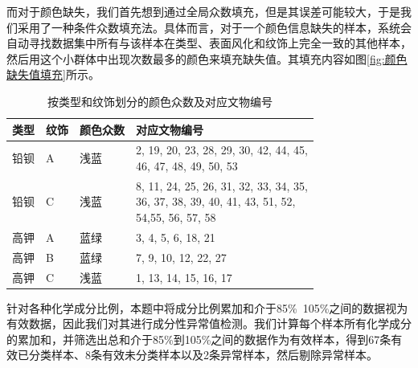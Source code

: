 而对于颜色缺失，我们首先想到通过全局众数填充，但是其误差可能较大，于是我们采用了一种条件众数填充法。具体而言，对于一个颜色信息缺失的样本，系统会自动寻找数据集中所有与该样本在类型、表面风化和纹饰上完全一致的其他样本，然后用这个小群体中出现次数最多的颜色来填充缺失值。其填充内容如图\ref{fig:颜色缺失值填充}所示。

\begin{table}[htbp]
	\centering
	\caption{按类型和纹饰划分的颜色众数及对应文物编号}
	\label{tab:颜色缺失值填充}
	\begin{tabular}{llll}
		\toprule
		\textbf{类型} & \textbf{纹饰} & \textbf{颜色众数} & \textbf{对应文物编号}                                        \\
		\midrule
		\rowcolor{gray!20}
		铅钡          & A           & 浅蓝            & \parbox[t]{6cm}{2, 19, 20, 23, 28, 29, 30, 42, 44, 45, \\ 46, 47, 48, 49, 50, 53} \\
		铅钡          & C           & 浅蓝            & \parbox[t]{6cm}{8, 11, 24, 25, 26, 31, 32, 33, 34, 35, \\ 36, 37, 38, 39, 40, 41, 43, 51, 52,  \\ 54,55, 56, 57, 58} \\
		高钾          & A           & 蓝绿            & 3, 4, 5, 6, 18, 21                                     \\
		高钾          & B           & 蓝绿            & 7, 9, 10, 12, 22, 27                                   \\
		高钾          & C           & 浅蓝            & 1, 13, 14, 15, 16, 17                                  \\
		\bottomrule
	\end{tabular}
\end{table}

针对各种化学成分比例，本题中将成分比例累加和介于85\%~105\%之间的数据视为有效数据，因此我们对其进行成分性异常值检测。我们计算每个样本所有化学成分的累加和，并筛选出总和介于85\%到105\%之间的数据作为有效样本，得到67条有效已分类样本、8条有效未分类样本以及2条异常样本，然后剔除异常样本。

